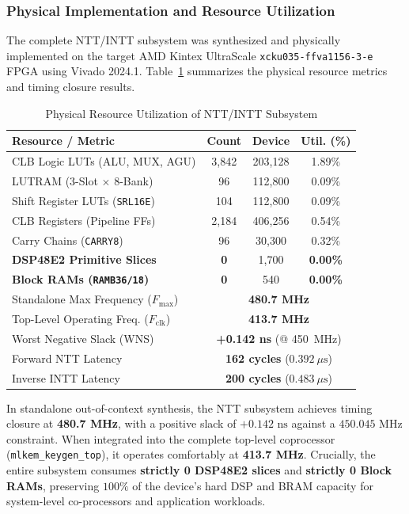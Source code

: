 \subsubsection{Physical Implementation and Resource Utilization}
The complete NTT/INTT subsystem was synthesized and physically implemented on the target AMD Kintex UltraScale \texttt{xcku035-ffva1156-3-e} FPGA using Vivado 2024.1. Table~\ref{tab:ntt_resource_utilization} summarizes the physical resource metrics and timing closure results.

\begin{table}[!t]
\caption{Physical Resource Utilization of NTT/INTT Subsystem}
\label{tab:ntt_resource_utilization}
\centering
\footnotesize
\setlength{\tabcolsep}{3pt}
\begin{tabular}{lccc}
\toprule
\textbf{Resource / Metric} & \textbf{Count} & \textbf{Device} & \textbf{Util. (\%)} \\
\midrule
CLB Logic LUTs (ALU, MUX, AGU) & 3,842 & 203,128 & 1.89\% \\
LUTRAM (3-Slot $\times$ 8-Bank) & 96 & 112,800 & 0.09\% \\
Shift Register LUTs (\texttt{SRL16E}) & 104 & 112,800 & 0.09\% \\
CLB Registers (Pipeline FFs) & 2,184 & 406,256 & 0.54\% \\
Carry Chains (\texttt{CARRY8}) & 96 & 30,300 & 0.32\% \\
\textbf{DSP48E2 Primitive Slices} & \textbf{0} & 1,700 & \textbf{0.00\%} \\
\textbf{Block RAMs (\texttt{RAMB36/18})} & \textbf{0} & 540 & \textbf{0.00\%} \\
\midrule
Standalone Max Frequency ($F_{\text{max}}$) & \multicolumn{3}{c}{\textbf{480.7 MHz}} \\
Top-Level Operating Freq. ($F_{\text{clk}}$) & \multicolumn{3}{c}{\textbf{413.7 MHz}} \\
Worst Negative Slack (WNS) & \multicolumn{3}{c}{\textbf{+0.142 ns} (@ 450~MHz)} \\
Forward NTT Latency & \multicolumn{3}{c}{\textbf{162 cycles} ($0.392\ \mu\text{s}$)} \\
Inverse INTT Latency & \multicolumn{3}{c}{\textbf{200 cycles} ($0.483\ \mu\text{s}$)} \\
\bottomrule
\end{tabular}
\end{table}

In standalone out-of-context synthesis, the NTT subsystem achieves timing closure at \textbf{480.7 MHz}, with a positive slack of $+0.142\text{ ns}$ against a $450.045\text{ MHz}$ constraint. When integrated into the complete top-level coprocessor (\texttt{mlkem\_keygen\_top}), it operates comfortably at \textbf{413.7 MHz}. Crucially, the entire subsystem consumes \textbf{strictly 0 DSP48E2 slices} and \textbf{strictly 0 Block RAMs}, preserving $100\%$ of the device's hard DSP and BRAM capacity for system-level co-processors and application workloads.
